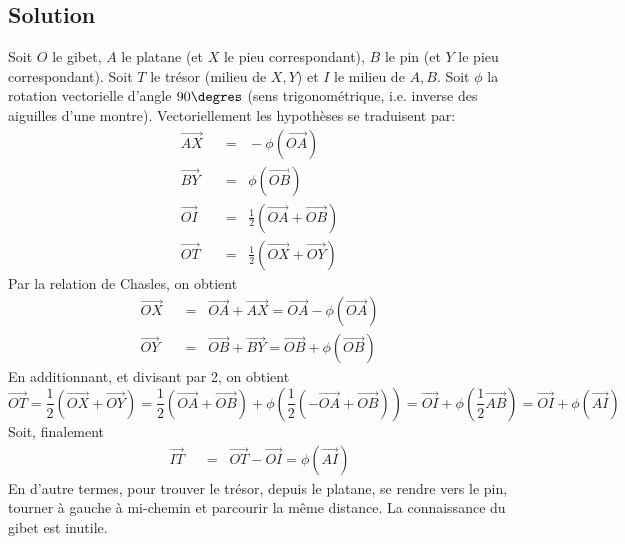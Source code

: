 \documentclass{article}
\newcommand{\eqnsymb}[1]{\;\;{#1}\;\;}
\newenvironment{solution}{\subsection{Solution}}{\pagebreak}
\begin{document}
\begin{solution}
\begin{center}
\end{center}
Soit $O$ le gibet, $A$ le platane (et $X$ le pieu correspondant), $B$ le pin (et $Y$ le pieu correspondant). Soit $T$ le trésor (milieu de $X,Y$) et $I$ le milieu de $A,B$. Soit $\phi$ la rotation vectorielle d'angle $90\degres$ (sens trigonométrique, i.e. inverse des aiguilles d'une montre). Vectoriellement les hypothèses se traduisent par:
\begin{align*}
\overrightarrow{AX} & \eqnsymb{=} -\phi(\overrightarrow{OA}) \\
\overrightarrow{BY} & \eqnsymb{=} \phi(\overrightarrow{OB}) \\
\overrightarrow{OI} & \eqnsymb{=} \frac{1}{2} (\overrightarrow{OA}+\overrightarrow{OB}) \\
\overrightarrow{OT} & \eqnsymb{=} \frac{1}{2} (\overrightarrow{OX}+\overrightarrow{OY})
\end{align*}
Par la relation de Chasles, on obtient
\begin{align*}
\overrightarrow{OX} & \eqnsymb{=} \overrightarrow{OA}+\overrightarrow{AX} = \overrightarrow{OA} - \phi(\overrightarrow{OA}) \\
\overrightarrow{OY} & \eqnsymb{=} \overrightarrow{OB}+\overrightarrow{BY} = \overrightarrow{OB} + \phi(\overrightarrow{OB})
\end{align*}
En additionnant, et divisant par 2, on obtient
\[
\overrightarrow{OT} = \frac{1}{2} (\overrightarrow{OX}+\overrightarrow{OY}) =
\frac{1}{2} (\overrightarrow{OA}+\overrightarrow{OB}) +\phi(\frac{1}{2}(-\overrightarrow{OA}+\overrightarrow{OB})) =
\overrightarrow{OI}+\phi(\frac{1}{2}\overrightarrow{AB}) =
\overrightarrow{OI}+\phi(\overrightarrow{AI})
\]
Soit, finalement
\begin{align*}
\overrightarrow{IT} & \eqnsymb{=} \overrightarrow{OT}-\overrightarrow{OI} =\phi(\overrightarrow{AI})
\end{align*}
En d'autre termes, pour trouver le trésor, depuis le platane, se rendre vers le pin, tourner à gauche à mi-chemin et parcourir la même distance. La connaissance du gibet est inutile.
\end{solution}
\end{document}
